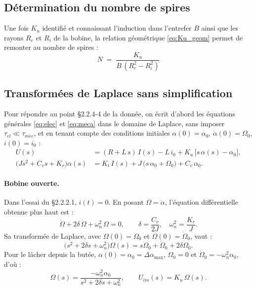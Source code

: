 \subsection{Détermination du nombre de spires}
\label{sec:nbre_spires}

Une fois \(K_u\) identifié et connaissant l'induction dans l'entrefer \(B\) ainsi que les rayons \(R_e\) et \(R_i\) de la bobine, la relation géométrique \eqref{eq:Ku_geom} permet de remonter au nombre de spires :
\begin{equation}
\boxed{\;N \;=\; \frac{K_u}{B\,(R_e^2 - R_i^2)}\;}
\label{eq:N_spires}
\end{equation}

\subsection{Transformées de Laplace sans simplification}
\label{sec:laplace}

Pour répondre au point §2.2.4-4 de la donnée, on écrit d'abord les équations générales \eqref{eq:elec} et \eqref{eq:meca} dans le domaine de Laplace, sans imposer \(\tau_{el} \ll \tau_{m\acute{e}c}\), et en tenant compte des conditions initiales \(\alpha(0) = \alpha_0\), \(\dot\alpha(0) = \Omega_0\), \(i(0) = i_0\) :
\[
\begin{aligned}
U(s) &= (R + L\,s)\,I(s) - L\,i_0 + K_u\,\bigl[s\,\alpha(s) - \alpha_0\bigr], \\
\bigl(J s^2 + C_v s + K_r\bigr)\alpha(s) &= K_t\,I(s) + J\,\bigl(s\,\alpha_0 + \Omega_0\bigr) + C_v\,\alpha_0.
\end{aligned}
\]

\paragraph{Bobine ouverte.}
Dans l'essai du §2.2.2.1, \(i(t)=0\). En posant \(\Omega=\dot\alpha\), l'équation différentielle obtenue plus haut est :
\[
\ddot\Omega + 2\delta\,\dot\Omega + \omega_n^2\,\Omega = 0,
\qquad
\delta=\frac{C_v}{2J},\quad \omega_n^2=\frac{K_r}{J}.
\]
Sa transformée de Laplace, avec \(\Omega(0)=\Omega_0\) et \(\dot\Omega(0)=\dot\Omega_0\), vaut :
\begin{equation}
\bigl(s^2+2\delta s+\omega_n^2\bigr)\Omega(s)
= s\Omega_0+\dot\Omega_0+2\delta\Omega_0.
\label{eq:laplace_open_general}
\end{equation}
Pour le lâcher depuis la butée, \(\alpha(0)=\alpha_0=\Delta\alpha_{\max}\), \(\Omega_0=0\) et \(\dot\Omega_0=-\omega_n^2\alpha_0\), d'où :
\begin{equation}
\Omega(s)=\frac{-\omega_n^2\alpha_0}{s^2+2\delta s+\omega_n^2},
\qquad
U_{im}(s)=K_u\,\Omega(s).
\label{eq:laplace_open_release}
\end{equation}

